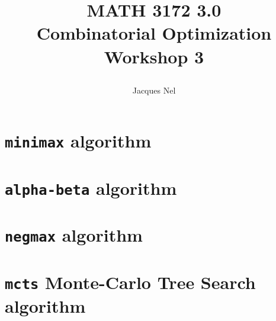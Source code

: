 \documentclass[11pt,oneside]{article}
\title{{\bf MATH 3172 3.0\\ Combinatorial Optimization}\\\vspace{10pt} \large Workshop 3     
    \author{Jacques Nel}
}
\begin{document}
\maketitle

\newpage

\section{\texttt{minimax} algorithm}

\section{\texttt{alpha-beta} algorithm}

\section{\texttt{negmax} algorithm}

\section{\texttt{mcts} Monte-Carlo Tree Search algorithm}
\end{document}
